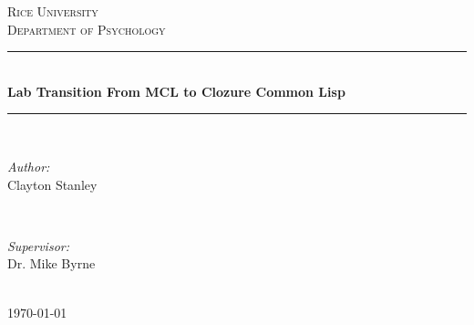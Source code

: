 \documentclass[12pt]{article} %
\begin{document}

\begin{titlepage}

\newcommand{\HRule}{\rule{\linewidth}{0.5mm}} %

\center %

\textsc{\LARGE Rice University}\\[1.5cm] %
\textsc{\Large Department of Psychology}\\[0.5cm] %

\HRule \\[0.4cm]
{ \huge \bfseries Lab Transition From MCL to Clozure Common Lisp}\\[0.4cm] %
\HRule \\[1.5cm]

\begin{minipage}{0.4\textwidth}
\begin{flushleft} \large
\emph{Author:}\\
Clayton Stanley %
\end{flushleft}
\end{minipage}
~
\begin{minipage}{0.4\textwidth}
\begin{flushright} \large
\emph{Supervisor:} \\
Dr. Mike Byrne %
\end{flushright}
\end{minipage}\\[4cm]

{\large \today}\\[3cm] %


\vfill %

\end{titlepage}

\end{document}
